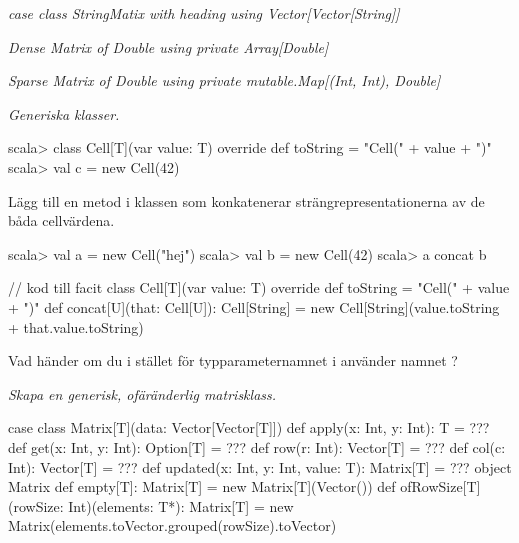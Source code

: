 

\Exercise{\ExeWeekNINE}

\begin{Goals}
\item 
\end{Goals}

\begin{Preparations}
\item 
\end{Preparations}

\BasicTasks %

\Task \emph{case class StringMatix with heading using Vector[Vector[String]]}

\Task \emph{Dense Matrix of Double using private Array[Double]}

\Task \emph{Sparse Matrix of Double using private mutable.Map[(Int, Int), Double]}


\Task \emph{Generiska klasser.} 

\begin{REPL}
scala> class Cell[T](var value: T){
         override def toString = "Cell(" + value + ")"
       }
scala> val c = new Cell(42)
\end{REPL}

\Subtask Lägg till en metod  i klassen  som konkatenerar strängrepresentationerna av de båda cellvärdena.

\begin{REPL}
scala> val a = new Cell("hej")
scala> val b = new Cell(42)
scala> a concat b
\end{REPL}

\begin{Code}
// kod till facit
class Cell[T](var value: T){
  override def toString = "Cell(" + value + ")"
  def concat[U](that: Cell[U]): Cell[String] = 
    new Cell[String](value.toString + that.value.toString)
}
\end{Code}

\Subtask\Pen Vad händer om du i stället för typparameternamnet  i  använder namnet ?

\Task \emph{Skapa en generisk, ofäränderlig matrisklass.}

\begin{Code}
case class Matrix[T](data: Vector[Vector[T]]) {
  def apply(x: Int, y: Int): T = ???
  def get(x: Int, y: Int): Option[T] = ???
  def row(r: Int): Vector[T] = ???
  def col(c: Int): Vector[T] = ???
  def updated(x: Int, y: Int, value: T): Matrix[T] = ???
}
object Matrix {
  def empty[T]: Matrix[T] = new Matrix[T](Vector())
  def ofRowSize[T](rowSize: Int)(elements: T*): Matrix[T] =
    new Matrix(elements.toVector.grouped(rowSize).toVector)
}
\end{Code}

\Subtask 

\ExtraTasks %

\Task 

\AdvancedTasks %

\Task     
    